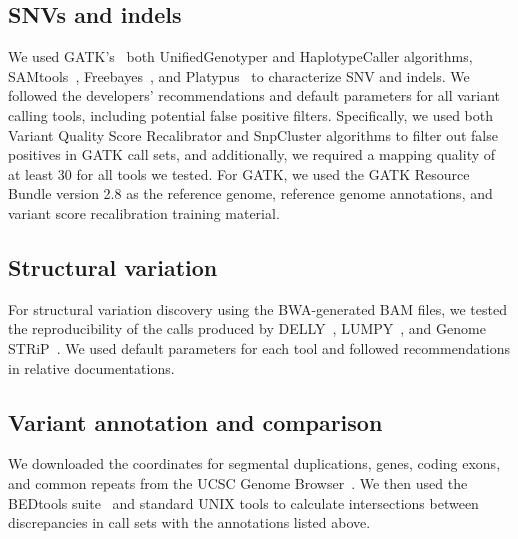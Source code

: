 \documentclass{bioinfo}
\begin{document}
\begin{methods}
\subsection*{SNVs and indels}

We used GATK's~\citep{DePristo2011} both UnifiedGenotyper and HaplotypeCaller algorithms, SAMtools~\citep{Li2009b}, Freebayes~\citep{Garrison2012}, and Platypus~\citep{Rimmer2014} to characterize
SNV and indels. We followed the developers' recommendations and default parameters for all variant calling tools, including potential false positive filters. 
Specifically, we used both Variant Quality Score Recalibrator and SnpCluster algorithms to filter out false positives in GATK call sets, and additionally, 
we required a mapping quality of at least 30 for all tools we tested.
For GATK, we used the GATK Resource Bundle version 2.8 as the reference genome, reference genome annotations, and variant score recalibration training material.

\subsection*{Structural variation}

For structural variation discovery using the BWA-generated BAM files, we tested the reproducibility of the calls produced by DELLY~\citep{Rausch2012}, LUMPY~\citep{Layer2014}, and Genome STRiP~\citep{Handsaker2011,Handsaker2015}. 
We used default parameters for each tool and followed recommendations in relative documentations.


\subsection*{Variant annotation and comparison}

We downloaded the coordinates for segmental duplications, genes, coding exons, and common repeats from the UCSC Genome Browser~\citep{Kent2002}. 
We then used the BEDtools suite~\citep{Quinlan2010a} and standard UNIX tools 
 to calculate intersections between discrepancies in call sets with the annotations listed above.


\end{methods}
\end{document}
